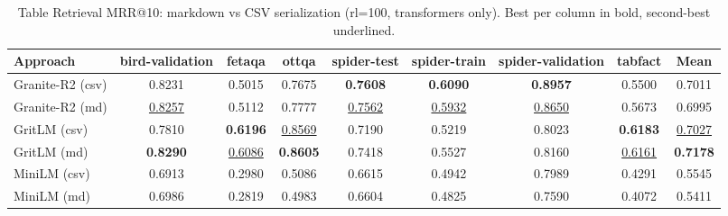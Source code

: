 \begin{table}[t]
\centering
\begin{tabular*}{\textwidth}{lccccccc|c}
\hline
Approach & bird-validation & fetaqa & ottqa & spider-test & spider-train & spider-validation & tabfact & Mean \\
\hline
Granite-R2 (csv) & 0.8231 & 0.5015 & 0.7675 & \textbf{0.7608} & \textbf{0.6090} & \textbf{0.8957} & 0.5500 & 0.7011 \\
Granite-R2 (md) & \underline{0.8257} & 0.5112 & 0.7777 & \underline{0.7562} & \underline{0.5932} & \underline{0.8650} & 0.5673 & 0.6995 \\
GritLM (csv) & 0.7810 & \textbf{0.6196} & \underline{0.8569} & 0.7190 & 0.5219 & 0.8023 & \textbf{0.6183} & \underline{0.7027} \\
GritLM (md) & \textbf{0.8290} & \underline{0.6086} & \textbf{0.8605} & 0.7418 & 0.5527 & 0.8160 & \underline{0.6161} & \textbf{0.7178} \\
MiniLM (csv) & 0.6913 & 0.2980 & 0.5086 & 0.6615 & 0.4942 & 0.7989 & 0.4291 & 0.5545 \\
MiniLM (md) & 0.6986 & 0.2819 & 0.4983 & 0.6604 & 0.4825 & 0.7590 & 0.4072 & 0.5411 \\
\hline
\end{tabular*}
\caption{Table Retrieval MRR@10: markdown vs CSV serialization (rl=100, transformers only). Best per column in bold, second-best underlined.}
\label{tab:retrieval_md_csv}
\end{table}
